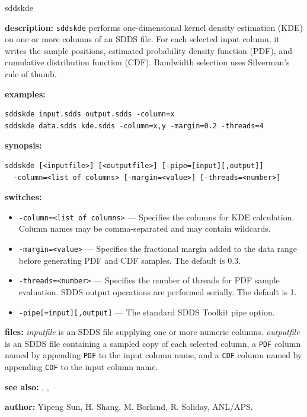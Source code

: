 \begin{sddsprog}{sddskde}
  \item \textbf{description:} \verb|sddskde| performs one-dimensional kernel density estimation (KDE) on one or more columns of an SDDS file. For each selected input column, it writes the sample positions, estimated probability density function (PDF), and cumulative distribution function (CDF). Bandwidth selection uses Silverman's rule of thumb.

  \item \textbf{examples:}
    \begin{verbatim}
sddskde input.sdds output.sdds -column=x
sddskde data.sdds kde.sdds -column=x,y -margin=0.2 -threads=4
    \end{verbatim}

  \item \textbf{synopsis:}
    \begin{verbatim}
sddskde [<inputfile>] [<outputfile>] [-pipe=[input][,output]]
  -column=<list of columns> [-margin=<value>] [-threads=<number>]
    \end{verbatim}

  \item \textbf{switches:}
    \begin{itemize}
      \item \verb|-column=<list of columns>| --- Specifies the columns for KDE calculation. Column names may be comma-separated and may contain wildcards.
      \item \verb|-margin=<value>| --- Specifies the fractional margin added to the data range before generating PDF and CDF samples. The default is 0.3.
      \item \verb|-threads=<number>| --- Specifies the number of threads for PDF sample evaluation. SDDS output operations are performed serially. The default is 1.
      \item \verb|-pipe[=input][,output]| --- The standard SDDS Toolkit pipe option.
    \end{itemize}

  \item \textbf{files:} \emph{inputfile} is an SDDS file supplying one or more numeric columns. \emph{outputfile} is an SDDS file containing a sampled copy of each selected column, a \verb|PDF| column named by appending \verb|PDF| to the input column name, and a \verb|CDF| column named by appending \verb|CDF| to the input column name.

  \item \textbf{see also:} , , 

  \item \textbf{author:} Yipeng Sun, H. Shang, M. Borland, R. Soliday, ANL/APS.
\end{sddsprog}

